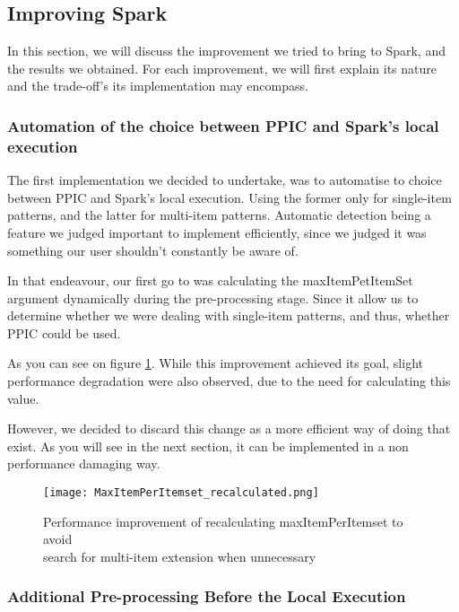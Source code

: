 \documentclass{eplmastersthesis}
\begin{document}
\subsection{Improving Spark}

In this section, we will discuss the improvement we tried to bring to Spark, and the results we obtained. For each improvement, we will first explain its nature and the trade-off's its implementation may encompass.

\subsubsection{Automation of the choice between PPIC and Spark's local execution}

The first implementation we decided to undertake, was to automatise to choice between PPIC and Spark's local execution. Using the former only for single-item patterns, and the latter for multi-item patterns. Automatic detection being a feature we judged important to implement efficiently, since we judged it was something our user shouldn't constantly be aware of. \newline 

In that endeavour, our first go to was calculating the maxItemPetItemSet argument dynamically during the pre-processing stage. Since it allow us to determine whether we were dealing with single-item patterns, and thus, whether PPIC could be used.

As you can see on figure \ref{fig:maxItemPerItemset_recalculated}.
While this improvement achieved its goal, slight performance degradation were also observed, due to the need for calculating this value. \newline

However, we decided to discard this change as a more efficient way of doing that exist. As you will see in the next section, it can be implemented in a non performance damaging way.

\begin{figure}[h]
  \centering
  \texttt{[image: MaxItemPerItemset\_recalculated.png]}
  \caption[Automatic detection of item-sets type in dataset]{
		Performance improvement of recalculating maxItemPerItemset to avoid \\
		search for multi-item extension when unnecessary
	\endtabular}
  \label{fig:maxItemPerItemset_recalculated}
\end{figure}

\subsubsection{Additional Pre-processing Before the Local Execution}
\end{document}
